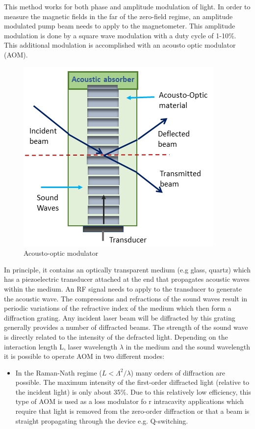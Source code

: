 This method works for both phase and
amplitude modulation of light.  In order to measure the magnetic
fields in the far of the zero-field regime, an amplitude modulated
pump beam needs to apply to the magnetometer.  This amplitude
modulation is done by a square wave modulation with a duty cycle of
1-10\%.  This additional modulation is accomplished with an acousto
optic modulator (AOM).
\begin{figure}[h]
\centering
\includegraphics[width=0.7\linewidth]{figures/AOM}
\caption{Acousto-optic modulator}
\end{figure}
In principle, it contains an optically transparent medium (e.g glass, quartz) which has a piezoelectric transducer attached at the end that propagates acoustic waves within the medium. An RF signal needs to apply to the transducer to generate the acoustic wave. The compressions and refractions of the sound waves result in periodic variations of the refractive index of the medium which then form a diffraction grating. Any incident laser beam will be diffracted by this grating generally provides a number of diffracted beams. The strength of the sound wave is directly related to the intensity of the defracted light. Depending on the interaction length L, laser wavelength $\lambda$ in the medium and the sound wavelength it is possible to operate AOM in two different modes: 
\begin{itemize}
\item  In the Raman-Nath regime ($L<\Lambda^2/\lambda$) many orders of diffraction are possible. The maximum intensity of the first-order diffracted light (relative to the incident light) is only about 35\%. Due to this relatively low efficiency, this type of AOM is used as a loss modulator fo r intracavity applications which require that light is removed from the zero-order diffraction or that a beam is straight propagating through the device e.g. Q-switching.


\end{itemize}
